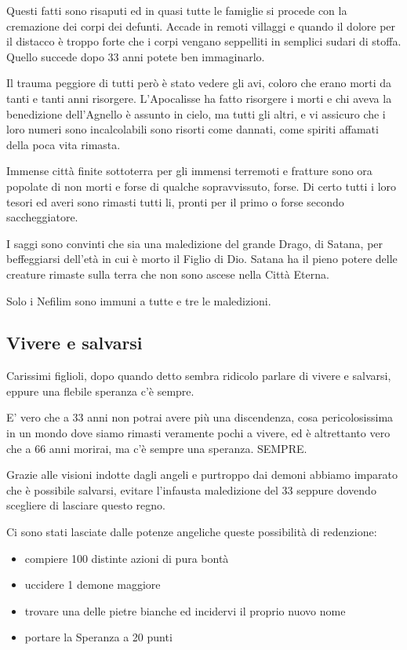 \documentclass[a4paper,twoside,openany]{book}
\begin{document}
\begin{multicols}{2}
Questi fatti sono risaputi ed in quasi tutte le famiglie si procede con la cremazione dei corpi dei defunti. Accade in remoti villaggi e quando il dolore per il distacco è troppo forte che i corpi vengano seppelliti in semplici sudari di stoffa. Quello succede dopo 33 anni potete ben immaginarlo.

Il trauma peggiore di tutti però è stato vedere gli avi, coloro che erano morti da tanti e tanti anni risorgere. L'Apocalisse ha fatto risorgere i morti e chi aveva la benedizione dell'Agnello è assunto in cielo, ma tutti gli altri, e vi assicuro che i loro numeri sono incalcolabili sono risorti come dannati, come spiriti affamati della poca vita rimasta.

Immense città finite sottoterra per gli immensi terremoti e fratture sono ora popolate di non morti e forse di qualche sopravvissuto, forse. Di certo tutti i loro tesori ed averi sono rimasti tutti li, pronti per il primo o forse secondo saccheggiatore.

I saggi sono convinti che sia una maledizione del grande Drago, di Satana, per beffeggiarsi dell'età in cui è morto il Figlio di Dio.
Satana ha il pieno potere delle creature rimaste sulla terra che non sono ascese nella Città Eterna.

Solo i Nefilim sono immuni a tutte e tre le maledizioni.

\subsection{Vivere e salvarsi}

Carissimi figlioli, dopo quando detto sembra ridicolo parlare di vivere e salvarsi, eppure una flebile speranza c'è sempre.

E' vero che a 33 anni non potrai avere più una discendenza, cosa pericolosissima in un mondo dove siamo rimasti veramente pochi a vivere, ed è altrettanto vero che a 66 anni morirai, ma c'è sempre una speranza. SEMPRE.

Grazie alle visioni indotte dagli angeli e purtroppo dai demoni abbiamo imparato che è possibile salvarsi, evitare l'infausta maledizione del 33 seppure dovendo scegliere di lasciare questo regno.

Ci sono stati lasciate dalle potenze angeliche queste possibilità di redenzione:

\begin{itemize}

\item compiere 100 distinte azioni di pura bontà
\item uccidere 1 demone maggiore
\item trovare una delle pietre bianche ed incidervi il proprio nuovo nome
\item portare la Speranza a 20 punti


\end{itemize}
\end{multicols}
\end{document}
